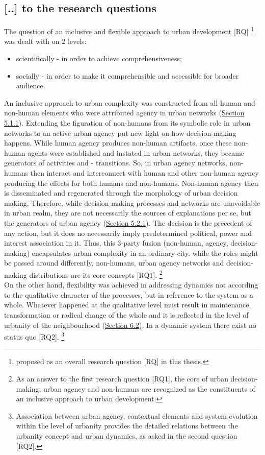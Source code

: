 \documentclass[11pt]{report}
\begin{document}
{{{\subsection{[..] to the research questions}

The question of an inclusive and flexible approach to urban development [RQ]
\footnote{proposed as an overall research question [RQ] in this thesis.}
was dealt with on 2 levels:

\begin{itemize}
\item scientifically - in order to achieve comprehensiveness;
\item socially - in order to make it comprehensible and accessible for broader audience.
\end{itemize}

An inclusive approach to urban complexity was constructed from all human and non-human elements who were attributed agency in urban networks (\href{Section 5.1.1}{Section 5.1.1}).
Extending the figuration of non-humans from its symbolic role in urban networks to an active urban agency put new light on how decision-making happens.
While human agency produces non-human artifacts, once these non-human agents were established and instated in urban networks, they became generators of activities and - transitions. 
So, in urban agency networks, non-humans then interact and interconnect with human and other non-human agency producing the effects for both humans and non-humans.
Non-human agency then is disseminated and regenerated through the morphology of urban decision making.
Therefore, while decision-making processes and networks are unavoidable in urban realm, they are not necessarily the sources of explanations per se, but the generators of urban agency (\href{Section 5.2.1}{Section 5.2.1}). The decision is the precedent of any action, but it does no necessarily imply predetermined political, power and interest association in it. 
Thus, this 3-party fusion (non-human, agency, decision-making) encapsulates urban complexity in an ordinary city. while the roles might be passed around differently, non-humans, urban agency networks and decision-making distributions are its core concepts [RQ1].
\footnote{As an answer to the first research question [RQ1], the core of urban decision-making, urban agency and non-humans are recognized as the constituents of an inclusive approach to urban development.}
\\

On the other hand, flexibility was achieved in addressing dynamics not according to the qualitative character of the processes, but in reference to the system as a whole. Whatever happened at the qualitative level must result in maintenance, transformation or radical change of the whole and it is reflected in the level of urbanity of the neighbourhood (\href{Section 6.2}{Section 6.2}). In a dynamic system there exist no status quo [RQ2].
\footnote{Association between urban agency, contextual elements and system evolution within the level of urbanity provides the detailed relations between the urbanity concept and urban dynamics, as asked in the second question [RQ2].}
\\

}}}
\end{document}

